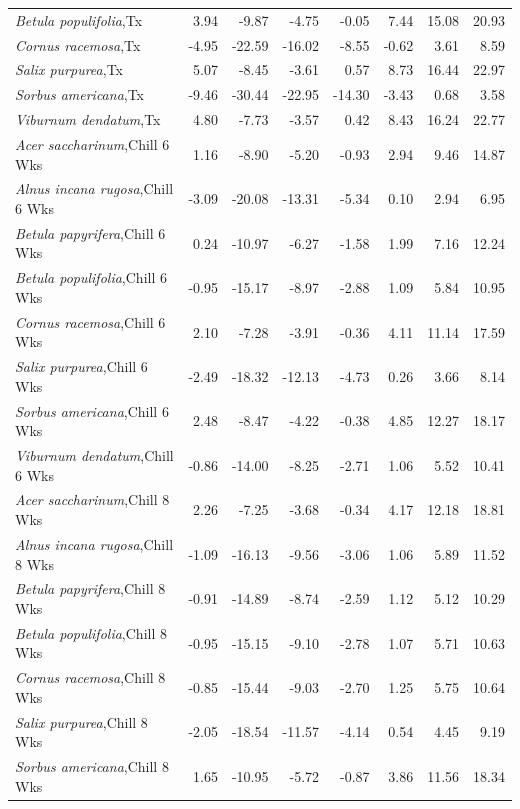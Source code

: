 \documentclass{article}\usepackage[]{graphicx}\usepackage[]{color}
\begin{document}
\begin{longtable}{lrrrrrrr}
  \textit{Betula populifolia},Tx & 3.94 & -9.87 & -4.75 & -0.05 & 7.44 & 15.08 & 20.93 \\ 
  \textit{Cornus racemosa},Tx & -4.95 & -22.59 & -16.02 & -8.55 & -0.62 & 3.61 & 8.59 \\ 
  \textit{Salix purpurea},Tx & 5.07 & -8.45 & -3.61 & 0.57 & 8.73 & 16.44 & 22.97 \\ 
  \textit{Sorbus americana},Tx & -9.46 & -30.44 & -22.95 & -14.30 & -3.43 & 0.68 & 3.58 \\ 
  \textit{Viburnum dendatum},Tx & 4.80 & -7.73 & -3.57 & 0.42 & 8.43 & 16.24 & 22.77 \\ 
  \textit{Acer saccharinum},Chill 6 Wks & 1.16 & -8.90 & -5.20 & -0.93 & 2.94 & 9.46 & 14.87 \\ 
  \textit{Alnus incana rugosa},Chill 6 Wks & -3.09 & -20.08 & -13.31 & -5.34 & 0.10 & 2.94 & 6.95 \\ 
  \textit{Betula papyrifera},Chill 6 Wks & 0.24 & -10.97 & -6.27 & -1.58 & 1.99 & 7.16 & 12.24 \\ 
  \textit{Betula populifolia},Chill 6 Wks & -0.95 & -15.17 & -8.97 & -2.88 & 1.09 & 5.84 & 10.95 \\ 
  \textit{Cornus racemosa},Chill 6 Wks & 2.10 & -7.28 & -3.91 & -0.36 & 4.11 & 11.14 & 17.59 \\ 
  \textit{Salix purpurea},Chill 6 Wks & -2.49 & -18.32 & -12.13 & -4.73 & 0.26 & 3.66 & 8.14 \\ 
  \textit{Sorbus americana},Chill 6 Wks & 2.48 & -8.47 & -4.22 & -0.38 & 4.85 & 12.27 & 18.17 \\ 
  \textit{Viburnum dendatum},Chill 6 Wks & -0.86 & -14.00 & -8.25 & -2.71 & 1.06 & 5.52 & 10.41 \\ 
  \textit{Acer saccharinum},Chill 8 Wks & 2.26 & -7.25 & -3.68 & -0.34 & 4.17 & 12.18 & 18.81 \\ 
  \textit{Alnus incana rugosa},Chill 8 Wks & -1.09 & -16.13 & -9.56 & -3.06 & 1.06 & 5.89 & 11.52 \\ 
  \textit{Betula papyrifera},Chill 8 Wks & -0.91 & -14.89 & -8.74 & -2.59 & 1.12 & 5.12 & 10.29 \\ 
  \textit{Betula populifolia},Chill 8 Wks & -0.95 & -15.15 & -9.10 & -2.78 & 1.07 & 5.71 & 10.63 \\ 
  \textit{Cornus racemosa},Chill 8 Wks & -0.85 & -15.44 & -9.03 & -2.70 & 1.25 & 5.75 & 10.64 \\ 
  \textit{Salix purpurea},Chill 8 Wks & -2.05 & -18.54 & -11.57 & -4.14 & 0.54 & 4.45 & 9.19 \\ 
  \textit{Sorbus americana},Chill 8 Wks & 1.65 & -10.95 & -5.72 & -0.87 & 3.86 & 11.56 & 18.34 \\ 

\end{longtable}
\end{document}
